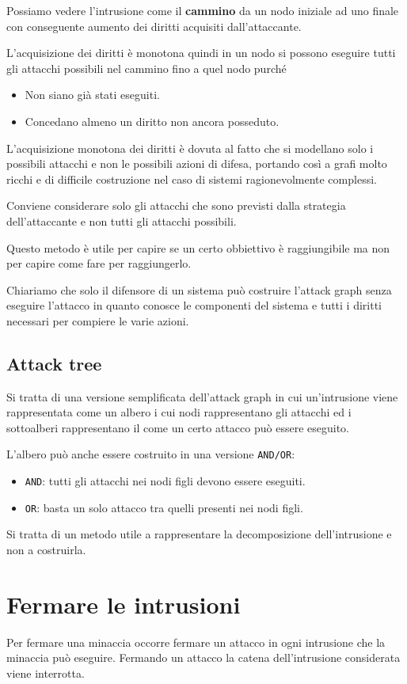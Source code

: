 Possiamo vedere l'intrusione come il \textbf{cammino} da un nodo iniziale ad uno finale con conseguente aumento dei
diritti acquisiti dall'attaccante.

L'acquisizione dei diritti è monotona quindi in un nodo si possono eseguire tutti gli attacchi possibili nel cammino
fino a quel nodo purché
\begin{itemize}
	\item Non siano già stati eseguiti.
	\item Concedano almeno un diritto non ancora posseduto.
\end{itemize}
L'acquisizione monotona dei diritti è dovuta al fatto che si modellano solo i possibili attacchi e non le possibili
azioni di difesa, portando così a grafi molto ricchi e di difficile costruzione nel caso di sistemi ragionevolmente
complessi.

Conviene considerare solo gli attacchi che sono previsti dalla strategia dell'attaccante e non tutti gli attacchi
possibili.

Questo metodo è utile per capire se un certo obbiettivo è raggiungibile ma non per capire come fare per raggiungerlo.

Chiariamo che solo il difensore di un sistema può costruire l'attack graph senza eseguire l'attacco in quanto conosce
le componenti del sistema e tutti i diritti necessari per compiere le varie azioni.

\subsection{Attack tree}
Si tratta di una versione semplificata dell'attack graph in cui un'intrusione viene rappresentata come un albero i cui
nodi rappresentano gli attacchi ed i sottoalberi rappresentano il come un certo attacco può essere eseguito.

L'albero può anche essere costruito in una versione \verb|AND/OR|:
\begin{itemize}
	\item \verb|AND|: tutti gli attacchi nei nodi figli devono essere eseguiti.
	\item \verb|OR|: basta un solo attacco tra quelli presenti nei nodi figli.
\end{itemize}
Si tratta di un metodo utile a rappresentare la decomposizione dell'intrusione e non a costruirla.

\section{Fermare le intrusioni}
Per fermare una minaccia occorre fermare un attacco in ogni intrusione che la minaccia può eseguire. Fermando un
attacco la catena dell'intrusione considerata viene interrotta.

